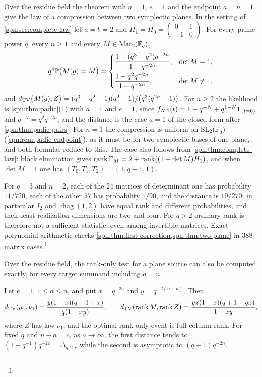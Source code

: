 \begin{example}\label{spn:thm:two-plane}
Over the residue field the theorem with $a=1$, $e=1$ and the endpoint $a=n=1$ give the law of a
compression between two symplectic planes. In the setting of \cref{spn:sec:complete-law} let
$a=b=2$ and $H_1=H_0=\left(\begin{smallmatrix}0&1\\-1&0\end{smallmatrix}\right)$. For every
prime power $q$, every $n\ge1$ and every $M\in\operatorname{Mat}_2(\mathbb{F}_q)$,
\[
 q^4\mathbb{P}\bigl(M(g)=M\bigr)=
 \begin{cases}
 \dfrac{1+(q^3-q^2)q^{-2n}}{1-q^{-2n}},&\det M=1,\\[8pt]
 \dfrac{1-q^{2}q^{-2n}}{1-q^{-2n}},&\det M\ne1,
 \end{cases}
\]
and
$d_{\mathrm{TV}}\bigl(M(g),Z\bigr)=(q^3-q^2+1)(q^2-1)/\bigl(q^3(q^{2n}-1)\bigr)$. For $n\ge2$ the
likelihood is \cref{spn:thm:padic}(1) with $a=1$ and $e=1$, since
$f_{N,1}(t)=1-q^{-N}+q^{1-N}\mathbf 1_{\{t=0\}}$ and $q^{-N}=q^2q^{-2n}$, and the distance is the
case $a=1$ of the closed form after \cref{spn:thm:padic-pairs}. For $n=1$ the compression is
uniform on $\operatorname{SL}_2(\mathbb{F}_q)$ (\cref{spn:rem:padic-endpoint}), as it must be for two symplectic bases
of one plane, and both formulas reduce to this. The case also follows from
\cref{spn:thm:complete-law}: block elimination gives $\operatorname{rank}\Gamma_M=2+\operatorname{rank}((1-\det M)H_1)$, and
when $\det M=1$ one has $(T_0,T_1,T_2)=(1,q+1,1)$.
\end{example}

For $q=3$ and $n=2$, each of the $24$ matrices of determinant one has probability $11/720$, each
of the other $57$ has probability $1/90$, and the distance is $19/270$; in particular $I_2$ and
$\operatorname{diag}(1,2)$ have equal rank and different probabilities, and their least
realization dimensions are two and four. For $q>2$ ordinary rank is therefore not a sufficient
statistic, even among invertible matrices. Exact polynomial arithmetic checks
\cref{spn:thm:first-correction,spn:thm:two-plane} in $388$ matrix
cases.\footnote{}

Over the residue field, the rank-only test for a plane source can also be computed exactly, for
every target summand including $a=n$.

\begin{proposition}\label{spn:prop:plane-rank}
Let $e=1$, $1\le a\le n$, and put $x=q^{-2a}$ and $y=q^{-2(n-a)}$. Then
\[
 d_{\mathrm{TV}}(\mu_1,\nu_1)=\frac{y(1-x)(q-1+x)}{q(1-xy)},\qquad
 d_{\mathrm{TV}}\bigl(\operatorname{rank} M,\operatorname{rank} Z\bigr)=\frac{yx(1-x)(q+1-qx)}{1-xy},
\]
where $Z$ has law $\nu_1$, and the optimal rank-only event is full column rank. For fixed $q$ and
$n-a=c$, as $a\to\infty$, the first distance tends to $(1-q^{-1})q^{-2c}=\Delta_{q,2,c}$ while the
second is asymptotic to $(q+1)q^{-2n}$.
\end{proposition}

